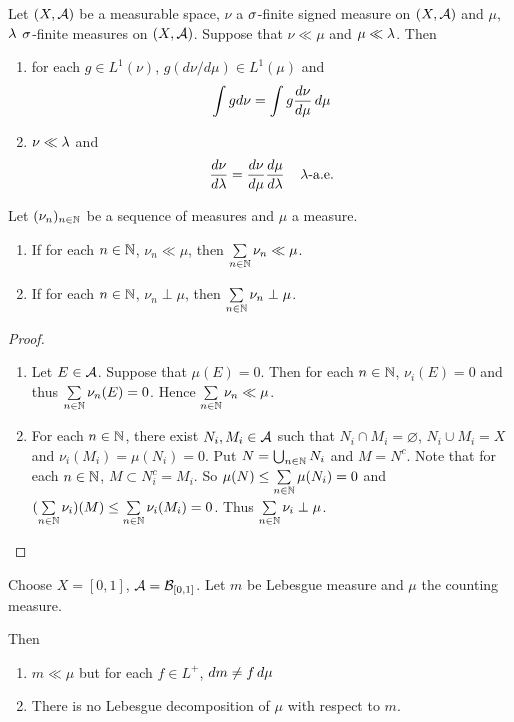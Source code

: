 \documentclass{book}
\begin{document}
	\begin{thm}
		Let $(X, \mathcal{A})$ be a measurable space, $\nu$ a $\sigma$-finite signed measure on $(X, \mathcal{A})$ and $\mu$, $\lambda$ $\sigma$-finite measures on $(X,\mathcal{A})$. Suppose that $\nu \ll \mu$ and $\mu \ll \lambda$. Then 
		\begin{enumerate}
			\item for each $g \in L^1(\nu)$, $g(d\nu/d\mu) \in  L^1(\mu)$ and $$\int g d\nu = \int g \frac{d\nu}{d\mu} \, d \mu$$
			\item $\nu \ll \lambda$ and $$\frac{d \nu}{d\lambda} = \frac{d \nu}{d\mu} \frac{d\mu}{d\lambda} \hspace{4mm} \lambda \text{-a.e.}$$
		\end{enumerate}
	\end{thm}
	
	\begin{ex}  
		Let $(\nu_n)_{n \in \mathbb{N}}$ be a sequence of measures and $\mu$ a measure. 
		\begin{enumerate}
			\item If for each $n \in \mathbb{N}$, $\nu_n \ll \mu$, then $\sum\limits_{n \in \mathbb{N}} \nu_n \ll \mu$. 
			\item If for each $n \in \mathbb{N}$, $\nu_n \perp \mu$, then $\sum\limits_{n \in \mathbb{N}} \nu_n \perp \mu$.
		\end{enumerate} 
	\end{ex}
	
	\begin{proof}
		\begin{enumerate}
			\item Let $E \in \mathcal{A}$. Suppose that $\mu(E) = 0$. Then for each $n \in \mathbb{N}$, $\nu_i(E) = 0$ and thus $\sum\limits_{n \in \mathbb{N}} \nu_n(E) = 0$. Hence $\sum\limits_{n \in \mathbb{N}} \nu_n \ll \mu$.
			\item For each $n \in \mathbb{N}$, there exist $N_i, M_i \in \mathcal{A}$ such that $N_i \cap M_i = \varnothing$, $N_i \cup M_i = X$ and $\nu_i(M_i) = \mu(N_i) = 0$. Put $N = \bigcup_{n \in \mathbb{N}} N_i$ and $M = N^c$. Note that for each $n \in \mathbb{N}$, $M \subset N_i^c = M_i$. So $\mu(N) \leq \sum\limits_{n \in \mathbb{N}} \mu(N_i) = 0$ and $(\sum\limits_{n \in \mathbb{N}} \nu_i) (M) \leq \sum\limits_{n \in \mathbb{N}} \nu_i(M_i) = 0$. Thus $\sum\limits_{n \in \mathbb{N}} \nu_i \perp \mu$.
		\end{enumerate}
	\end{proof}
	
	
	\begin{ex}  
		Choose $X = [0,1]$, $\mathcal{A} = \mathcal{B}_{[0,1]}$. Let $m$ be Lebesgue measure and $\mu$ the counting measure. 
		
		Then 
		\begin{enumerate}
			\item $m \ll \mu$ but for each $f \in L^+$, $dm \neq f \, d \mu$
			\item There is no Lebesgue decomposition of $\mu$ with respect to $m$.
		\end{enumerate}
	\end{ex}
	
\end{document}
